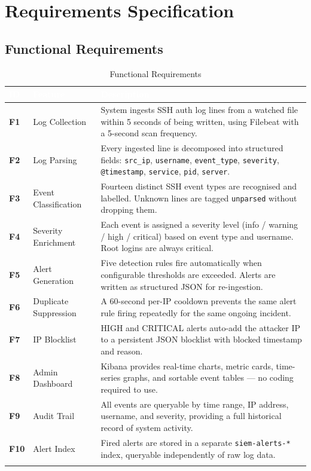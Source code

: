 \documentclass[12pt,a4paper]{article}
\newcommand{\field}[1]{\texttt{#1}}
\begin{document}
\newpage

\section{Requirements Specification}

\subsection{Functional Requirements}

\begin{longtable}{>{\bfseries\small}p{0.8cm} >{\small}p{3.8cm} >{\small}p{8.5cm}}
  \toprule
  \rowcolor{tabhead}
  \textcolor{white}{\textbf{ID}} &
  \textcolor{white}{\textbf{Feature}} &
  \textcolor{white}{\textbf{Description}} \\
  \midrule\endhead
  F1 & Log Collection &
    System ingests SSH auth log lines from a watched file within 5 seconds
    of being written, using Filebeat with a 5-second scan frequency. \\
  \rowcolor{rowalt}
  F2 & Log Parsing &
    Every ingested line is decomposed into structured fields: \field{src\_ip},
    \field{username}, \field{event\_type}, \field{severity}, \field{@timestamp},
    \field{service}, \field{pid}, \field{server}. \\
  F3 & Event Classification &
    Fourteen distinct SSH event types are recognised and labelled. Unknown
    lines are tagged \field{unparsed} without dropping them. \\
  \rowcolor{rowalt}
  F4 & Severity Enrichment &
    Each event is assigned a severity level (info / warning / high / critical)
    based on event type and username. Root logins are always critical. \\
  F5 & Alert Generation &
    Five detection rules fire automatically when configurable thresholds are
    exceeded. Alerts are written as structured JSON for re-ingestion. \\
  \rowcolor{rowalt}
  F6 & Duplicate Suppression &
    A 60-second per-IP cooldown prevents the same alert rule firing repeatedly
    for the same ongoing incident. \\
  F7 & IP Blocklist &
    HIGH and CRITICAL alerts auto-add the attacker IP to a persistent JSON
    blocklist with blocked timestamp and reason. \\
  \rowcolor{rowalt}
  F8 & Admin Dashboard &
    Kibana provides real-time charts, metric cards, time-series graphs, and
    sortable event tables — no coding required to use. \\
  F9 & Audit Trail &
    All events are queryable by time range, IP address, username, and severity,
    providing a full historical record of system activity. \\
  \rowcolor{rowalt}
  F10 & Alert Index &
    Fired alerts are stored in a separate \field{siem-alerts-*} index,
    queryable independently of raw log data. \\
  \bottomrule
  \caption{Functional Requirements}
\end{longtable}
\end{document}

